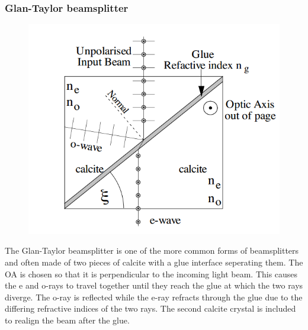 \subsubsection{Glan-Taylor beamsplitter}
\begin{minipage}{0.5\linewidth}
	\begin{figure}[H]
	\includegraphics[scale=0.7]{Photonics/beamsplitter}
	\end{figure}
\end{minipage}
\begin{minipage}{0.5\linewidth}
	The Glan-Taylor beamsplitter is one of the more common forms of beamsplitters and often made of two pieces of calcite with a glue interface seperating them.  
	The OA is chosen so that it is perpendicular to the incoming light beam. 
	This causes the e and o-rays to travel together until they reach the glue at which the two rays diverge. 
	The o-ray is reflected while the e-ray refracts through the glue due to the differing refractive indices of the two rays.
	The second calcite crystal is included to realign the beam after the glue.
\end{minipage}
